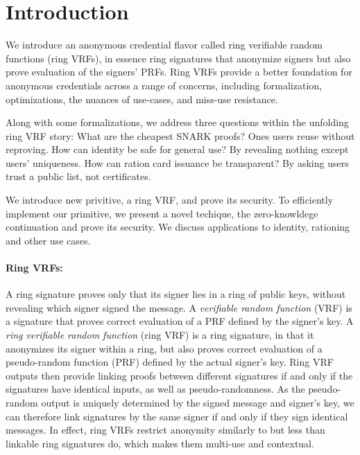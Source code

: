 \section{Introduction}

\def\qaudbreak{\eprint{\quad}{\\}}


We introduce an anonymous credential flavor called
ring verifiable random functions (ring VRFs),
in essence ring signatures that anonymize signers but
also prove evaluation of the signers' PRFs.
Ring VRFs provide a better foundation for anonymous credentials
across a range of concerns, including formalization, optimizations,
the nuances of use-cases, and miss-use resistance.

Along with some formalizations, we address three questions within
the unfolding ring VRF story:
What are the cheapest SNARK proofs?  Ones users reuse without reproving.
How can identity be safe for general use?  By revealing nothing except users' uniqueness.
How can ration card issuance be transparent?  By asking users trust a public list, not certificates.

We introduce new privitive, a ring VRF, and prove its security. To efficiently implement our primitive, we present a novel techique, the zero-knowldege continuation and prove its security. We discuss applications to identity, rationing and other use cases.



\paragraph{Ring VRFs:}

A ring signature \cite{ring_accountable,ring_efficient,ring_linkable,ring_noRO,ring_sublinear} proves only that its  signer lies in a ring
of public keys, without revealing which signer  signed the message.
A {\it verifiable random function} (VRF) is a signature that proves
correct evaluation of a PRF defined by the signer's key.
A {\it ring verifiable random function} (ring VRF) is a ring signature, in
that it anonymizes its  signer within a ring,
but also proves correct evaluation of a pseudo-random function (PRF)
defined by the actual signer's key. %
%
Ring VRF outputs then provide linking proofs between different signatures
if and only if  the signatures have identical inputs, as well as pseudo-randomness.
As the pseudo-random output is uniquely determined by the signed message
and signer's key, we can therefore link signatures by the
same signer if and only if they sign identical messages.
In effect, ring VRFs restrict anonymity similarly to but less than
linkable ring signatures \cite{ring_linkable,ring_linkablee}  do, which makes them multi-use and contextual.

